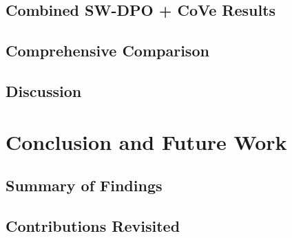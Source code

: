 \documentclass[12pt,a4paper,oneside]{report}
\begin{document}
\section{Combined SW-DPO + CoVe Results}
\label{sec:combined-results}

\section{Comprehensive Comparison}
\label{sec:comparison}

\section{Discussion}
\label{sec:discussion}
%


\chapter{Conclusion and Future Work}
\label{ch:conclusion}


\section{Summary of Findings}
\label{sec:summary}

\section{Contributions Revisited}
\label{sec:contributions-revisited}
\end{document}
